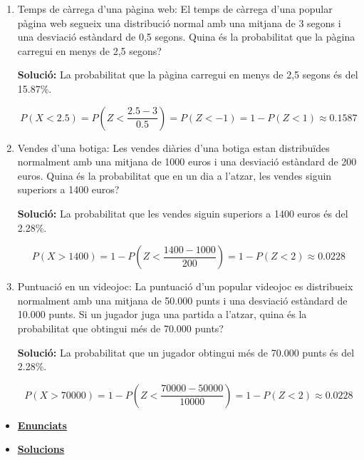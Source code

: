 \documentclass[12pt]{article}
\begin{document}
\begin{exemple} [title=]

\begin{enumerate}[start=28]

    \item Temps de càrrega d'una pàgina web: El temps de càrrega d'una popular pàgina web segueix una distribució normal amb una mitjana de 3 segons i una desviació estàndard de 0,5 segons. Quina és la probabilitat que la pàgina carregui en menys de 2,5 segons?
    
    \textbf{Solució:} La probabilitat que la pàgina carregui en menys de 2,5 segons és del 15.87\%.
    
    \[
    P(X < 2.5) = P\left(Z< \frac{2.5 - 3}{0.5} \right) = P(Z< -1) = 1 - P(Z< 1) \approx 0.1587
    \]

    \item Vendes d'una botiga: Les vendes diàries d'una botiga estan distribuïdes normalment amb una mitjana de 1000 euros i una desviació estàndard de 200 euros. Quina és la probabilitat que en un dia a l'atzar, les vendes siguin superiors a 1400 euros?
    
    \textbf{Solució:} La probabilitat que les vendes siguin superiors a 1400 euros és del 2.28\%.
    
    \[
    P(X > 1400) = 1 - P\left(Z< \frac{1400 - 1000}{200} \right) = 1 - P(Z< 2) \approx 0.0228
    \]

    \item Puntuació en un videojoc: La puntuació d'un popular videojoc es distribueix normalment amb una mitjana de 50.000 punts i una desviació estàndard de 10.000 punts. Si un jugador juga una partida a l'atzar, quina és la probabilitat que obtingui més de 70.000 punts?
    
    \textbf{Solució:} La probabilitat que un jugador obtingui més de 70.000 punts és del 2.28\%.
    
    \[
    P(X > 70000) = 1 - P\left(Z< \frac{70000 - 50000}{10000} \right) = 1 - P(Z< 2) \approx 0.0228
    \]
\end{enumerate}
\end{exemple}

\begin{exercici}[title=Llistat d'exercicis]

\begin{itemize}
    \item \href{https://drive.google.com/file/d/1tT6VaOj4vLEFK77SqO5Wd5QGnfw7bM9I/view?usp=sharing}{\textbf{Enunciats}}
    \item \href{https://drive.google.com/file/d/1QqXifKK_FFQN99KFx3mSppJcV2S2H2oF/view?usp=sharing}{\textbf{Solucions}}
\end{itemize}
    
\end{exercici}
\end{document}
